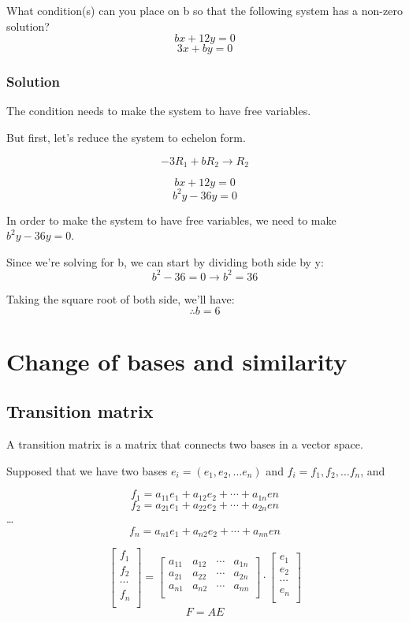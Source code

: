 \documentclass{book}
\begin{document}
What condition{(s)} can you place on b so that the following system has a non-zero solution?
\[bx + 12y = 0\]
\[3x + by = 0\]

\subsection*{Solution}

The condition needs to make the system to have free variables.

But first, let's reduce the system to echelon form.

\[-3R_1 + bR_2 \rightarrow R_2\]

\[bx + 12y = 0\]
\[b^2y - 36y = 0\]

In order to make the system to have free variables, we need to make \(b^2y - 36y = 0\).

Since we're solving for b, we can start by dividing both side by y:
\[b^2 - 36 = 0 \rightarrow b^2 = 36\]

Taking the square root of both side, we'll have:
\[\therefore b = 6\]

\chapter{Change of bases and similarity}

\section{Transition matrix}

A transition matrix is a matrix that connects two bases in a vector space.

Supposed that we have two bases \(e_i = (e_1, e_2, \ldots e_n)\) and \(f_i = f_1, f_2, \ldots f_n\), and

\[f_1 = a_{11}e_1 + a_{12}e_2 + \cdots + a_{1n}en\]
\[f_2 = a_{21}e_1 + a_{22}e_2 + \cdots + a_{2n}en\]
\ldots
\[f_n = a_{n1}e_1 + a_{n2}e_2 + \cdots + a_{nn}en\]

\[\begin{bmatrix}
	f_1 \\
	f_2 \\
	\cdots \\
	f_n \\
\end{bmatrix}
=
\begin{bmatrix}
	a_{11} & a_{12} & \cdots & a_{1n} \\
	a_{21} & a_{22} & \cdots & a_{2n} \\
	a_{n1} & a_{n2} & \cdots & a_{nn} \\
\end{bmatrix}
\cdot
\begin{bmatrix}
	e_1 \\
	e_2 \\
	\cdots \\
	e_n \\
\end{bmatrix}\]
\[F = AE\]
\end{document}

